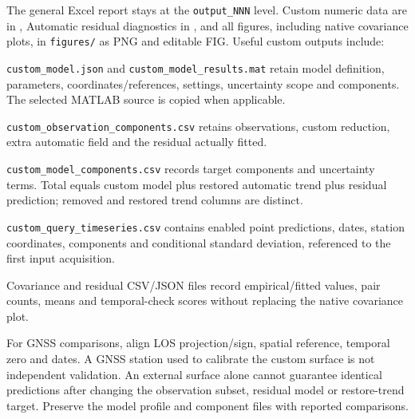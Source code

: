 The general Excel report stays at the \texttt{output\_NNN} level. Custom numeric data are in , Automatic residual diagnostics in , and all figures, including native covariance plots, in \texttt{figures/} as PNG and editable FIG. Useful custom outputs include:
\begin{description}[style=nextline]
\item[Model JSON/MAT and copied source] \texttt{custom\_model.json} and \texttt{custom\_model\_results.mat} retain model definition, parameters, coordinates/references, settings, uncertainty scope and components. The selected MATLAB source is copied when applicable.
\item[Observation components] \texttt{custom\_observation\_components.csv} retains observations, custom reduction, extra automatic field and the residual actually fitted.
\item[Prediction components] \texttt{custom\_model\_components.csv} records target components and uncertainty terms. Total equals custom model plus restored automatic trend plus residual prediction; removed and restored trend columns are distinct.
\item[Query series] \texttt{custom\_query\_timeseries.csv} contains enabled point predictions, dates, station coordinates, components and conditional standard deviation, referenced to the first input acquisition.
\item[Numeric checks] Covariance and residual CSV/JSON files record empirical/fitted values, pair counts, means and temporal-check scores without replacing the native covariance plot.
\end{description}

For GNSS comparisons, align LOS projection/sign, spatial reference, temporal zero and dates. A GNSS station used to calibrate the custom surface is not independent validation. An external surface alone cannot guarantee identical predictions after changing the observation subset, residual model or restore-trend target. Preserve the model profile and component files with reported comparisons.
